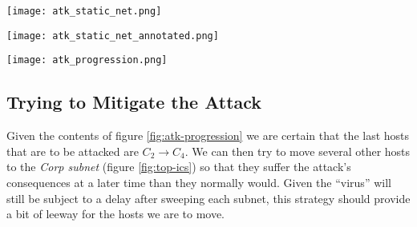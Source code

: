             \begin{sidewaysfigure}
                \centering
                \texttt{[image: atk\_static\_net.png]}
                \caption[\textit{QoS} on a Static Topology]{Evolution of the \textit{QoS} Over Time for a Static Topology.}
                \label{fig:static-atk}
            \end{sidewaysfigure}

            \begin{sidewaysfigure}
                \centering
                \texttt{[image: atk\_static\_net\_annotated.png]}
                \caption[Annotated \textit{QoS} on a Static Topology]{Annotated Evolution of the \textit{QoS} Over Time for a Static Topology.}
                \label{fig:static-atk-annotated}
            \end{sidewaysfigure}

            \begin{sidewaysfigure}
                \centering
                \texttt{[image: atk\_progression.png]}
                \caption[Attack Progression]{Attack Progression Over the Network.}
                \label{fig:atk-progression}
            \end{sidewaysfigure}

            

        \subsection{Trying to Mitigate the Attack}
            Given the contents of figure \ref{fig:atk-progression} we are certain that the last hosts that are to be attacked are $C_2 \to C_4$. We can then try to move several other hosts to the \textit{Corp subnet} (figure \ref{fig:top-ics}) so that they suffer the attack's consequences at a later time than they normally would. Given the ``virus'' will still be subject to a delay after sweeping each subnet, this strategy should provide a bit of leeway for the hosts we are to move.\\

